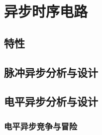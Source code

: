 \chapter{异步时序电路}
\newpage

\section{特性}

\section{脉冲异步分析与设计}

\section{电平异步分析与设计}

\subsection{电平异步竞争与冒险}

\newpage
